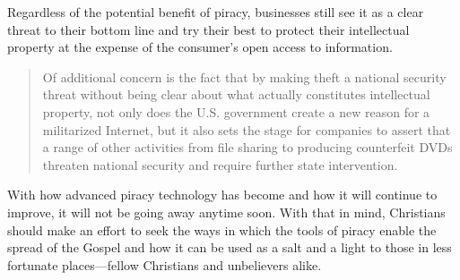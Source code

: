 \documentclass[onecolumn, 12pt]{article}
\begin{document}
Regardless of the potential benefit of piracy, businesses still see it as a clear threat
to their bottom line and try their best to protect their intellectual property at the
expense of the consumer's open access to information. \blockcquote[264]{halbert:agendas}
{Of additional concern is the fact that by making  theft a
national security threat without being clear about what actually constitutes intellectual
property, not only does the U.S. government create a new reason for a militarized
Internet, but it also sets the stage for companies to assert that a range of other
activities from file sharing to producing counterfeit DVDs threaten national security and
require further state intervention.}

With how advanced piracy technology has become and how it will continue to improve, it
will not be going away anytime soon. With that in mind, Christians should make an effort
to seek the ways in which the tools of piracy enable the spread of the Gospel and how it
can be used as a salt and a light to those in less fortunate places---fellow Christians
and unbelievers alike.

\clearpage
\nocite{*}
\printbibliography
\end{document}
